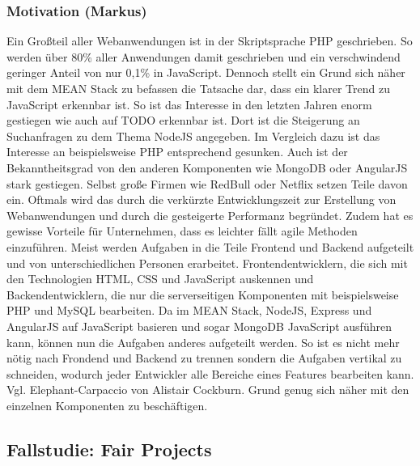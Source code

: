 \subsubsection{Motivation (Markus)}\label{motivation-markus}

Ein Großteil aller Webanwendungen ist in der Skriptsprache PHP
geschrieben. So werden über 80\% aller Anwendungen damit geschrieben und
ein verschwindend geringer Anteil von nur 0,1\% in JavaScript. Dennoch
stellt ein Grund sich näher mit dem MEAN Stack zu befassen die Tatsache
dar, dass ein klarer Trend zu JavaScript erkennbar ist. So ist das
Interesse in den letzten Jahren enorm gestiegen wie auch auf TODO
erkennbar ist. Dort ist die Steigerung an Suchanfragen zu dem Thema
NodeJS angegeben. Im Vergleich dazu ist das Interesse an beispielsweise
PHP entsprechend gesunken. Auch ist der Bekanntheitsgrad von den anderen
Komponenten wie MongoDB oder AngularJS stark gestiegen. Selbst große
Firmen wie RedBull oder Netflix setzen Teile davon ein. Oftmals wird das
durch die verkürzte Entwicklungszeit zur Erstellung von Webanwendungen
und durch die gesteigerte Performanz begründet. Zudem hat es gewisse
Vorteile für Unternehmen, dass es leichter fällt agile Methoden
einzuführen. Meist werden Aufgaben in die Teile Frontend und Backend
aufgeteilt und von unterschiedlichen Personen erarbeitet.
Frontendentwicklern, die sich mit den Technologien HTML, CSS und
JavaScript auskennen und Backendentwicklern, die nur die serverseitigen
Komponenten mit beispielsweise PHP und MySQL bearbeiten. Da im MEAN
Stack, NodeJS, Express und AngularJS auf JavaScript basieren und sogar
MongoDB JavaScript ausführen kann, können nun die Aufgaben anderes
aufgeteilt werden. So ist es nicht mehr nötig nach Frondend und Backend
zu trennen sondern die Aufgaben vertikal zu schneiden, wodurch jeder
Entwickler alle Bereiche eines Features bearbeiten kann. Vgl.
Elephant-Carpaccio von Alistair Cockburn. Grund genug sich näher mit den
einzelnen Komponenten zu beschäftigen.

\subsection{Fallstudie: Fair Projects}\label{fallstudie-fair-projects}
